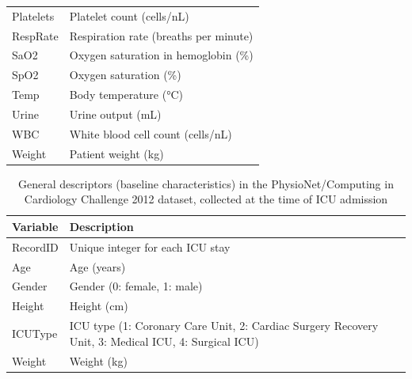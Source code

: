 \documentclass[preprint,12pt]{elsarticle}
\begin{document}
\begin{table}[h!]
\begin{small}
\begin{tabularx}{\textwidth}{lX}
        Platelets         & Platelet count (cells/nL) \\
        RespRate          & Respiration rate (breaths per minute) \\
        SaO2              & Oxygen saturation in hemoglobin (\%) \\
        SpO2              & Oxygen saturation (\%) \\
        Temp              & Body temperature (°C) \\
        Urine             & Urine output (mL) \\
        WBC               & White blood cell count (cells/nL) \\
        Weight            & Patient weight (kg) \\
        \bottomrule
    \end{tabularx}
\end{small}    \label{tab:icu_timeseries_variables}
\end{table}


\begin{table}[h!]
    \centering
    \caption{General descriptors (baseline characteristics) in the PhysioNet/Computing in Cardiology Challenge 2012 dataset, collected at the time of ICU admission}
    \small\begin{tabularx}{\textwidth}{lX}
        \toprule
        \textbf{Variable} & \textbf{Description} \\
        \midrule
        RecordID & Unique integer for each ICU stay \\
        Age      & Age (years)\\
        Gender   & Gender (0: female, 1: male) \\
        Height   & Height (cm)\\
        ICUType  & ICU type (1: Coronary Care Unit, 2: Cardiac Surgery Recovery Unit, 3: Medical ICU, 4: Surgical ICU)  \\
        Weight   & Weight (kg) \\
        \bottomrule
    \end{tabularx}
    \label{tab:icu_general_descriptors}
\end{table}
\end{document}
